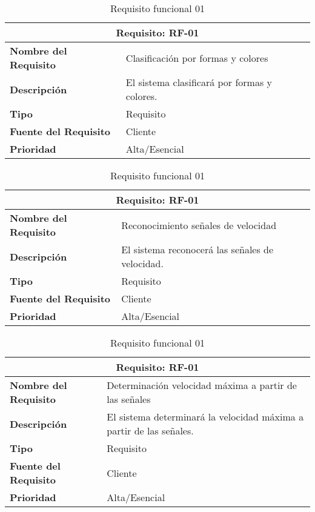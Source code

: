 \begin{table}[H]
\begin{center}
\begin{tabular}{p{} p{7cm}}
\multicolumn{2}{c}{\textbf{Requisito: RF-01} } \\
\hline \hline
\textbf{Nombre del Requisito} &  Clasificación por formas y colores\\
\hline
\textbf{Descripción} & El sistema clasificará por formas y colores.\\
\hline
\textbf{Tipo} & Requisito \\
\hline
\textbf{Fuente del Requisito} & Cliente \\
\hline
\textbf{Prioridad} & Alta/Esencial \\ \hline
\end{tabular}
\caption{Requisito funcional 01}
\label{tab:personal}
\end{center}
\end{table}

\begin{table}[H]
\begin{center}
\begin{tabular}{p{} p{7cm}}
\multicolumn{2}{c}{\textbf{Requisito: RF-01} } \\
\hline \hline
\textbf{Nombre del Requisito} &  Reconocimiento señales de velocidad \\
\hline
\textbf{Descripción} & El sistema reconocerá las señales de velocidad.
\\
\hline
\textbf{Tipo} & Requisito \\
\hline
\textbf{Fuente del Requisito} & Cliente \\
\hline
\textbf{Prioridad} & Alta/Esencial \\ \hline
\end{tabular}
\caption{Requisito funcional 01}
\label{tab:personal}
\end{center}
\end{table}

\begin{table}[H]
\begin{center}
\begin{tabular}{p{} p{7cm}}
\multicolumn{2}{c}{\textbf{Requisito: RF-01} } \\
\hline \hline
\textbf{Nombre del Requisito} & Determinación velocidad máxima a partir de las señales \\
\hline
\textbf{Descripción} & El sistema determinará la velocidad máxima a partir de las señales.\\
\hline
\textbf{Tipo} & Requisito \\
\hline
\textbf{Fuente del Requisito} & Cliente \\
\hline
\textbf{Prioridad} & Alta/Esencial \\ \hline
\end{tabular}
\caption{Requisito funcional 01}
\label{tab:personal}
\end{center}
\end{table}


